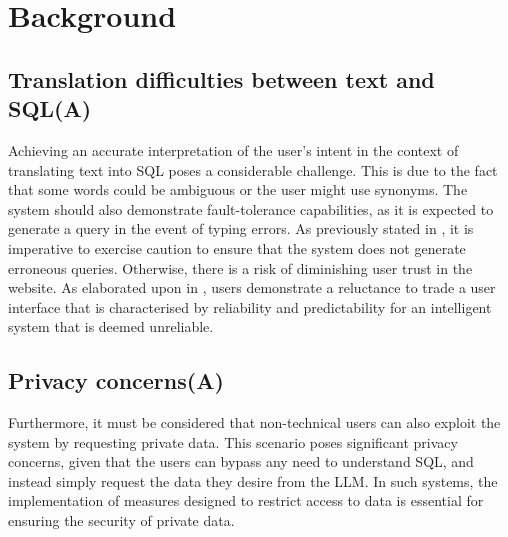 \documentclass[../../submission.tex]{subfiles}
\begin{document}
\section{Background}
\subsection{Translation difficulties between text and SQL(A)}
Achieving an accurate interpretation of the user's intent in the context of translating text into SQL poses a considerable challenge. 
This is due to the fact that some words could be ambiguous or the user might use synonyms.  
The system should also demonstrate fault-tolerance capabilities, as it is expected to generate a query in the event of typing errors. 
As previously stated in \cite{popescuEtalTowardsTheoryOfNaturalLanguage}, it is imperative to exercise caution to ensure that the system does not generate erroneous queries. 
Otherwise, there is a risk of diminishing user trust in the website.  
As elaborated upon in  \cite{popescuEtalTowardsTheoryOfNaturalLanguage}, users demonstrate a reluctance to trade a user interface that is characterised by reliability and predictability for an intelligent system that is deemed unreliable.


\subsection{Privacy concerns(A)}
Furthermore, it must be considered that non-technical users can also exploit the system by requesting private data. 
This scenario poses significant privacy concerns, given that the users can bypass any need to understand SQL, and instead simply request the data they desire from the LLM. 
In such systems, the implementation of measures designed to restrict access to data is essential for ensuring the security of private data.
\end{document}
